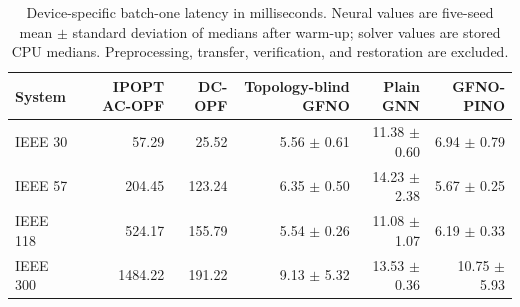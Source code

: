 \begin{table}[t]
\centering
\caption{Device-specific batch-one latency in milliseconds. Neural values are five-seed mean $\pm$ standard deviation of medians after warm-up; solver values are stored CPU medians. Preprocessing, transfer, verification, and restoration are excluded.}
\label{tab:latency}
\begin{tabular}{lrrrrr}
\toprule
System & IPOPT AC-OPF & DC-OPF & Topology-blind GFNO & Plain GNN & GFNO-PINO \\
\midrule
IEEE 30 & 57.29 & 25.52 & 5.56 $\pm$ 0.61 & 11.38 $\pm$ 0.60 & 6.94 $\pm$ 0.79 \\
IEEE 57 & 204.45 & 123.24 & 6.35 $\pm$ 0.50 & 14.23 $\pm$ 2.38 & 5.67 $\pm$ 0.25 \\
IEEE 118 & 524.17 & 155.79 & 5.54 $\pm$ 0.26 & 11.08 $\pm$ 1.07 & 6.19 $\pm$ 0.33 \\
IEEE 300 & 1484.22 & 191.22 & 9.13 $\pm$ 5.32 & 13.53 $\pm$ 0.36 & 10.75 $\pm$ 5.93 \\
\bottomrule
\end{tabular}
\end{table}
